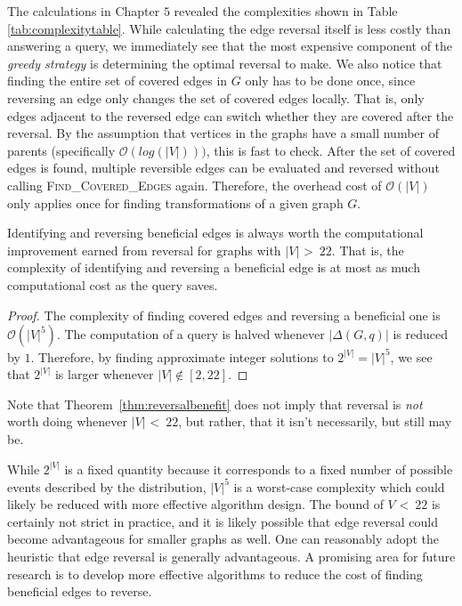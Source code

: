 \null \quad \quad The calculations in Chapter $5$ revealed the complexities shown in Table \ref{tab:complexitytable}.
While calculating the edge reversal itself is less costly than answering a query, we immediately see that the most expensive component of the \textit{greedy strategy} is determining the optimal reversal to make. \newline
\null \quad \quad We also notice that finding the entire set of covered edges in $G$ only has to be done once, since reversing an edge only changes the set of covered edges locally. That is, only edges adjacent to the reversed edge can switch whether they are covered after the reversal. By the assumption that vertices in the graphs have a small number of parents (specifically $\mathcal{O}(log(|V|)))$, this is fast to check. After the set of covered edges is found, multiple reversible edges can be evaluated and reversed without calling \textsc{Find\_Covered\_Edges} again. Therefore, the overhead cost of $\mathcal{O}(|V|)$ only applies once for finding transformations of a given graph $G$. \newline

\begin{theorem}\label{thm:reversalbenefit}
Identifying and reversing beneficial edges is always worth the computational improvement earned from reversal for graphs with $|V|$ \textgreater \ $22$. That is, the complexity of identifying and reversing a beneficial edge is at most as much computational cost as the query saves.
\end{theorem}

\begin{proof}
The complexity of finding covered edges and reversing a beneficial one is $\mathcal{O}(|V|^{5})$. The computation of a query is halved whenever $|\Delta(G,q)|$ is reduced by $1$. Therefore, by finding approximate integer solutions to $2^{|V|} = |V|^{5}$, we see that $2^{|V|}$ is larger whenever $|V| \not\in [2,22]$.
\end{proof}

\begin{remark}
Note that Theorem~\ref{thm:reversalbenefit} does not imply that reversal is \textit{not} worth doing whenever $|V|$ \textless \  $22$, but rather, that it isn't necessarily, but still may be.
\end{remark}

\begin{remark}
While $2^{|V|}$ is a fixed quantity because it corresponds to a fixed number of possible events described by the distribution, $|V|^{5}$ is a worst-case complexity which could likely be reduced with more effective algorithm design. The bound of $V$ \textless \ $22$ is certainly not strict in practice, and it is likely possible that edge reversal could become advantageous for smaller graphs as well. One can reasonably adopt the heuristic that edge reversal is generally advantageous. A promising area for future research is to develop more effective algorithms to reduce the cost of finding beneficial edges to reverse. 
\end{remark}

